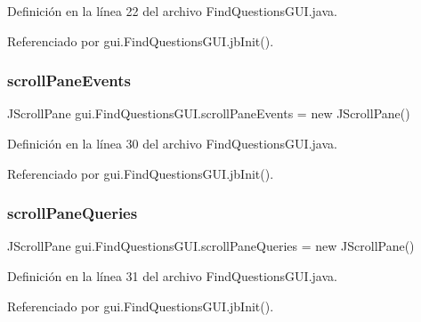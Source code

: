 Definición en la línea 22 del archivo Find\+Questions\+G\+U\+I.\+java.



Referenciado por gui.\+Find\+Questions\+G\+U\+I.\+jb\+Init().

\mbox{\label{classgui_1_1FindQuestionsGUI_ace1a155185cdae07dc3ed59a80f173fa}} 
\subsubsection{\texorpdfstring{scrollPaneEvents}{scrollPaneEvents}}
{\footnotesize\ttfamily J\+Scroll\+Pane gui.\+Find\+Questions\+G\+U\+I.\+scroll\+Pane\+Events = new J\+Scroll\+Pane()\hspace{0.3cm}{\ttfamily [private]}}



Definición en la línea 30 del archivo Find\+Questions\+G\+U\+I.\+java.



Referenciado por gui.\+Find\+Questions\+G\+U\+I.\+jb\+Init().

\mbox{\label{classgui_1_1FindQuestionsGUI_a7657e8883157c1d005bb73744458bbf8}} 
\subsubsection{\texorpdfstring{scrollPaneQueries}{scrollPaneQueries}}
{\footnotesize\ttfamily J\+Scroll\+Pane gui.\+Find\+Questions\+G\+U\+I.\+scroll\+Pane\+Queries = new J\+Scroll\+Pane()\hspace{0.3cm}{\ttfamily [private]}}



Definición en la línea 31 del archivo Find\+Questions\+G\+U\+I.\+java.



Referenciado por gui.\+Find\+Questions\+G\+U\+I.\+jb\+Init().

\mbox{\label{classgui_1_1FindQuestionsGUI_ae92822eeba6f2ba8dcae73d5ad17325c}} 
